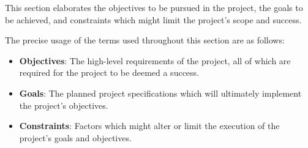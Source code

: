 This section elaborates the objectives to be pursued in the project, the goals to be achieved, and constraints which might limit the project's scope and success.

The precise usage of the terms used throughout this section are as follows:

\begin{itemize}
    \item \textbf{Objectives}: The high-level requirements of the project, 
    all of which are required for the project to be deemed a success.
    
    \item \textbf{Goals}: The planned project specifications which will ultimately implement the project's objectives.
    
    \item \textbf{Constraints}: Factors which might alter or limit the execution of the project's goals and objectives.

\end{itemize}